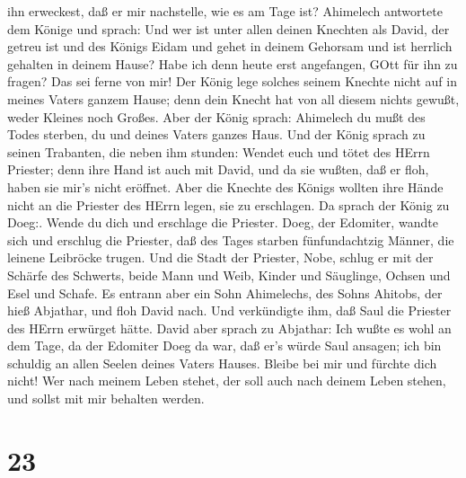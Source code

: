 ihn erweckest, daß er mir nachstelle, wie es am Tage ist? 
Ahimelech antwortete dem Könige und sprach: Und wer ist unter allen
deinen Knechten als David, der getreu ist und des Königs Eidam und gehet
in deinem Gehorsam und ist herrlich gehalten in deinem Hause?
 Habe ich denn heute erst angefangen, GOtt für ihn zu
fragen? Das sei ferne von mir! Der König lege solches seinem Knechte
nicht auf in meines Vaters ganzem Hause; denn dein Knecht hat von all
diesem nichts gewußt, weder Kleines noch Großes.  Aber der
König sprach: Ahimelech du mußt des Todes sterben, du und deines Vaters
ganzes Haus.  Und der König sprach zu seinen Trabanten, die
neben ihm stunden: Wendet euch und tötet des HErrn Priester; denn ihre
Hand ist auch mit David, und da sie wußten, daß er floh, haben sie mir's
nicht eröffnet. Aber die Knechte des Königs wollten ihre Hände nicht an
die Priester des HErrn legen, sie zu erschlagen.  Da sprach
der König zu Doeg:. Wende du dich und erschlage die Priester. Doeg, der
Edomiter, wandte sich und erschlug die Priester, daß des Tages starben
fünfundachtzig Männer, die leinene Leibröcke trugen.  Und
die Stadt der Priester, Nobe, schlug er mit der Schärfe des Schwerts,
beide Mann und Weib, Kinder und Säuglinge, Ochsen und Esel und Schafe.
 Es entrann aber ein Sohn Ahimelechs, des Sohns Ahitobs,
der hieß Abjathar, und floh David nach.  Und verkündigte
ihm, daß Saul die Priester des HErrn erwürget hätte.  David
aber sprach zu Abjathar: Ich wußte es wohl an dem Tage, da der Edomiter
Doeg da war, daß er's würde Saul ansagen; ich bin schuldig an allen
Seelen deines Vaters Hauses.  Bleibe bei mir und fürchte
dich nicht! Wer nach meinem Leben stehet, der soll auch nach deinem
Leben stehen, und sollst mit mir behalten werden.

\hypertarget{section-22}{%
\section{23}\label{section-22}}


